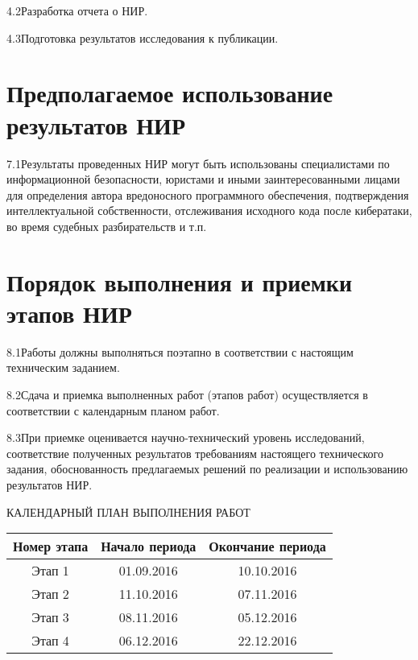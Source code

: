 4.2\hspace{5mm}Разработка отчета о НИР.

4.3\hspace{5mm}Подготовка результатов исследования к публикации.

\section{Предполагаемое использование результатов НИР}

7.1\hspace{5mm}Результаты проведенных НИР могут быть использованы специалистами по информационной безопасности, юристами и иными заинтересованными лицами для определения автора вредоносного программного обеспечения, подтверждения интеллектуальной собственности, отслеживания исходного кода после кибератаки, во время судебных разбирательств и т.п.

\section{Порядок выполнения и приемки этапов НИР}

8.1\hspace{5mm}Работы должны выполняться поэтапно в соответствии с настоящим техническим заданием.

8.2\hspace{5mm}Сдача и приемка выполненных работ (этапов работ) осуществляется в соответствии с календарным планом работ.

8.3\hspace{5mm}При приемке оценивается научно-технический уровень исследований, соответствие полученных результатов требованиям настоящего технического задания, обоснованность предлагаемых решений по реализации и использованию результатов НИР.

\begin{center}
  КАЛЕНДАРНЫЙ ПЛАН ВЫПОЛНЕНИЯ РАБОТ
\end{center}

\begin{table}[h]
\label{tab:3}
\begin{center}
\begin{tabular}{|c|c|c|}
\hline
Номер этапа & Начало периода & Окончание периода \\ 
\hline
Этап 1 & 01.09.2016 & 10.10.2016 \\
\hline
Этап 2 & 11.10.2016 & 07.11.2016 \\
\hline
Этап 3 & 08.11.2016 & 05.12.2016 \\
\hline
Этап 4 & 06.12.2016 & 22.12.2016 \\
\hline
\end{tabular}
\end{center}
\end{table}


